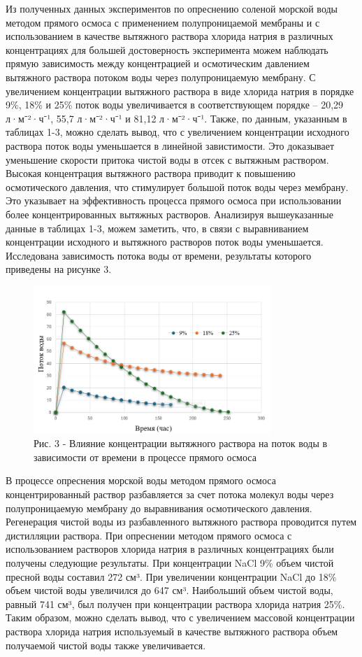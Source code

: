 Из полученных данных экспериментов по опреснению соленой морской воды
методом прямого осмоса с применением полупроницаемой мембраны и с
использованием в качестве вытяжного раствора хлорида натрия в различных
концентрациях для большей достоверность эксперимента можем наблюдать
прямую зависимость между концентрацией и осмотическим давлением
вытяжного раствора потоком воды через полупроницаемую мембрану. С
увеличением концентрации вытяжного раствора в виде хлорида натрия в
порядке 9\%, 18\% и 25\% поток воды увеличивается в соответствующем
порядке -- 20,29 л·м⁻²·ч⁻¹, 55,7 л·м⁻²·ч⁻¹ и 81,12 л·м⁻²·ч⁻¹. Также, по
данным, указанным в таблицах 1-3, можно сделать вывод, что с увеличением
концентрации исходного раствора поток воды уменьшается в линейной
завистимости. Это доказывает уменьшение скорости притока чистой воды в
отсек с вытяжным раствором. Высокая концентрация вытяжного раствора
приводит к повышению осмотического давления, что стимулирует большой
поток воды через мембрану. Это указывает на эффективность процесса
прямого осмоса при использовании более концентрированных вытяжных
растворов. Анализируя вышеуказанные данные в таблицах 1-3, можем
заметить, что, в связи с выравниванием концентрации исходного и
вытяжного растворов поток воды уменьшается. Исследована зависимость
потока воды от времени, результаты которого приведены на рисунке 3.

\begin{figure}[H]
	\centering
	\includegraphics[width=0.8\textwidth]{media/chem/image27}
	\caption*{Рис. 3 - Влияние концентрации вытяжного раствора на поток воды в
зависимости от времени в процессе прямого осмоса}
\end{figure}

В процессе опреснения морской воды методом прямого осмоса
концентрированный раствор разбавляется за счет потока молекул воды через
полупроницаемую мембрану до выравнивания осмотического давления.
Регенерация чистой воды из разбавленного вытяжного раствора проводится
путем дистилляции раствора. При опреснении методом прямого осмоса с
использованием растворов хлорида натрия в различных концентрациях были
получены следующие результаты. При концентрации NaCl 9\% объем чистой
пресной воды составил 272 см³. При увеличении концентрации NaCl до 18\%
объем чистой воды увеличился до 647 см³. Наибольший объем чистой воды,
равный 741 см³, был получен при концентрации раствора хлорида натрия
25\%. Таким образом, можно сделать вывод, что с увеличением массовой
концентрации раствора хлорида натрия используемый в качестве вытяжного
раствора объем получаемой чистой воды также увеличивается.

